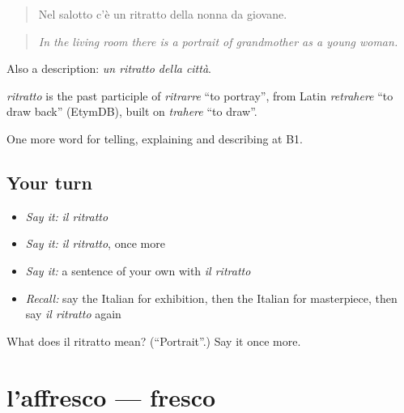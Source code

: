 \begin{quote}
Nel salotto c'è un ritratto della nonna da giovane.
\end{quote}

\begin{quote}
\emph{In the living room there is a portrait of grandmother as a young woman.}
\end{quote}

Also a description: \emph{un ritratto della città}.

\begin{cousinweb}
\emph{ritratto} is the past participle of \emph{ritrarre} \textquotedblleft{}to portray\textquotedblright{}, from Latin \emph{retrahere} \textquotedblleft{}to draw back\textquotedblright{} (EtymDB), built on \emph{trahere} \textquotedblleft{}to draw\textquotedblright{}.
\end{cousinweb}

\begin{grammarlens}[title={What you've built}]
One more word for telling, explaining and describing at B1.
\end{grammarlens}

\subsection*{Your turn}
\begin{itemize}
\raggedright
  \item \emph{Say it:} \emph{il ritratto}
  \item \emph{Say it:} \emph{il ritratto}, once more
  \item \emph{Say it:} a sentence of your own with \emph{il ritratto}
  \item \emph{Recall:} say the Italian for exhibition, then the Italian for masterpiece, then say \emph{il ritratto} again
\end{itemize}

\begin{tcolorbox}[breakable,colback=teal!4,colframe=teal!35!black,title={Before you move on}]
What does il ritratto mean? (\textquotedblleft{}Portrait\textquotedblright{}.) Say it once more.
\end{tcolorbox}
\section[l'affresco]{l'affresco — fresco}

\label{lesson:IT-C523-affresco}



